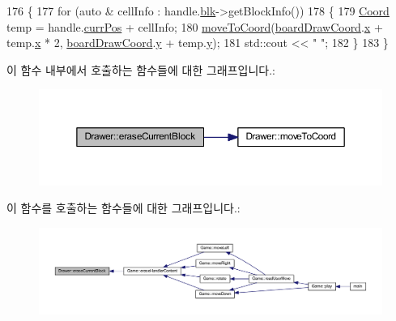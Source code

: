 \begin{DoxyCode}
176     \{
177         \textcolor{keywordflow}{for} (\textcolor{keyword}{auto} & cellInfo : handle.\mbox{\hyperlink{class_block_handler_ab57212ded2552ab5559d278c8538c454}{blk}}->getBlockInfo())
178         \{
179             \mbox{\hyperlink{struct_coord}{Coord}} temp = handle.\mbox{\hyperlink{class_block_handler_a11bd634fdc179446f9c6751e2394999e}{currPos}} + cellInfo;
180             \mbox{\hyperlink{class_drawer_ac1a96e007c07cab2e36a7c78484ee9a6}{moveToCoord}}(\mbox{\hyperlink{tetris__drawer_8h_afe5fa4d0ad1820f448b83de84142af4d}{boardDrawCoord}}.\mbox{\hyperlink{struct_coord_a696eaa744360fc791d0e3b331c549dbe}{x}} + temp.\mbox{\hyperlink{struct_coord_a696eaa744360fc791d0e3b331c549dbe}{x}} * 2, 
      \mbox{\hyperlink{tetris__drawer_8h_afe5fa4d0ad1820f448b83de84142af4d}{boardDrawCoord}}.\mbox{\hyperlink{struct_coord_a214166cca70cef7dda9201689c3e81ab}{y}} + temp.\mbox{\hyperlink{struct_coord_a214166cca70cef7dda9201689c3e81ab}{y}});
181             std::cout << \textcolor{stringliteral}{"  "};
182         \}
183     \}
\end{DoxyCode}
이 함수 내부에서 호출하는 함수들에 대한 그래프입니다.\+:
\nopagebreak
\begin{figure}[H]
\begin{center}
\leavevmode
\includegraphics[width=350pt]{class_drawer_a513de5ba9d65771ed21918a90cd70afa_cgraph}
\end{center}
\end{figure}
이 함수를 호출하는 함수들에 대한 그래프입니다.\+:
\nopagebreak
\begin{figure}[H]
\begin{center}
\leavevmode
\includegraphics[width=350pt]{class_drawer_a513de5ba9d65771ed21918a90cd70afa_icgraph}
\end{center}
\end{figure}
\mbox{\label{class_drawer_a3110e80f9256176373f0580788e69037}} 
